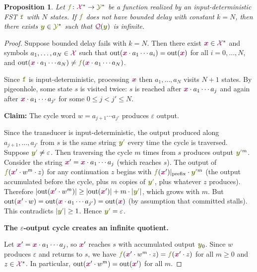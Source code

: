 \documentclass{article}
\newcommand{\mymacro}[1]{#1}
\newcommand{\Quotient}{{\color{TokenColor}\mathcal{Q}}}
\newcommand{\transFnSym}[0]{f}
\newcommand{\transFn}{\ensuremath{{\color{CharacterColor}\transFnSym}}\xspace}
\newcommand{\srcStr}{\ensuremath{{\color{TokenColor}\boldsymbol{x}}}\xspace}
\newcommand{\tgtStr}{{\color{CharacterColor}\boldsymbol{y}}}
\newcommand{\tgtStrp}{{\color{CharacterColor}\boldsymbol{y}^\prime}}
\newcommand{\srcAlphabet}[0]{{\color{TokenColor}\ensuremath{\mathcal{X}}}\xspace}
\newcommand{\tgtAlphabet}[0]{{\color{CharacterColor}\ensuremath{\mathcal{Y}}}\xspace}
\newcommand{\srcStrings}[0]{\ensuremath{\srcAlphabet^*}\xspace}
\newcommand{\tgtStrings}[0]{\ensuremath{\tgtAlphabet^*}\xspace}
\newcommand{\transST}{{\color{CharacterColor}\texttt{f}}}
\newcommand{\state}{\mymacro{s}}
\newcommand{\committed}{\mathrm{out}}
\theoremstyle{plain}
\newtheorem{proposition}[theorem]{Proposition}
\theoremstyle{definition}
\theoremstyle{remark}
\begin{document}
\begin{proposition}
\label{prop:necessary-fst}
Let $\transFn \colon \srcStrings \to \tgtStrings$ be a function realized by an
input-deterministic FST $\transST$ with $N$ states.  If $\transFn$ does not
have bounded delay with constant $k = N$, then there exists
$\tgtStr \in \tgtStrings$ such that $\Quotient(\tgtStr)$ is infinite.
\end{proposition}
\begin{proof}
Suppose bounded delay fails with $k = N$.  Then there exist $\srcStr \in
\srcStrings$ and symbols $a_1, \ldots, a_N \in \srcAlphabet$ such that
$\committed(\srcStr \cdot a_1 \cdots a_i) = \committed(\srcStr)$ for all
$i = 0, \ldots, N$, and $\committed(\srcStr \cdot a_1 \cdots a_N) \neq
\transFn(\srcStr \cdot a_1 \cdots a_N)$.

Since $\transST$ is input-deterministic, processing $\srcStr$ then
$a_1, \ldots, a_N$ visits $N + 1$ states.  By pigeonhole, some state $\state$
is visited twice: $\state$ is reached after $\srcStr \cdot a_1 \cdots a_j$
and again after $\srcStr \cdot a_1 \cdots a_{j'}$ for some $0 \leq j < j'
\leq N$.

\medskip\noindent\textbf{Claim:} The cycle word $w = a_{j+1} \cdots a_{j'}$
produces $\varepsilon$ output.

Since the transducer is input-deterministic, the output produced along
$a_{j+1}, \ldots, a_{j'}$ from $\state$ is the same string $\tgtStrp$ every
time the cycle is traversed.  Suppose $\tgtStrp \neq \varepsilon$.  Then
traversing the cycle $m$ times from $\state$ produces output $\tgtStrp^m$.
Consider the string $\srcStr' = \srcStr \cdot a_1 \cdots a_j$ (which reaches
$\state$).  The output of $\transFn(\srcStr' \cdot w^m \cdot z)$ for any
continuation $z$ begins with $\transFn(\srcStr') {|}_{\text{prefix}} \cdot
\tgtStrp^m$ (the output accumulated before the cycle, plus $m$ copies of
$\tgtStrp$, plus whatever $z$ produces).  Therefore
$|\committed(\srcStr' \cdot w^m)| \geq |\committed(\srcStr')| + m \cdot
|\tgtStrp|$, which grows with $m$.  But $\committed(\srcStr' \cdot w) =
\committed(\srcStr \cdot a_1 \cdots a_{j'}) = \committed(\srcStr)$
(by assumption that committed stalls).  This contradicts $|\tgtStrp| \geq 1$.
Hence $\tgtStrp = \varepsilon$.

\medskip\noindent\textbf{The $\varepsilon$-output cycle creates an infinite quotient.}

Let $\srcStr' = \srcStr \cdot a_1 \cdots a_j$, so $\srcStr'$ reaches $\state$
with accumulated output $\tgtStr_0$.  Since $w$ produces $\varepsilon$ and
returns to $\state$, we have $\transFn(\srcStr' \cdot w^m \cdot z) =
\transFn(\srcStr' \cdot z)$ for all $m \geq 0$ and $z \in \srcStrings$.  In
particular, $\committed(\srcStr' \cdot w^m) = \committed(\srcStr')$ for all
$m$.


\end{proof}
\end{document}
